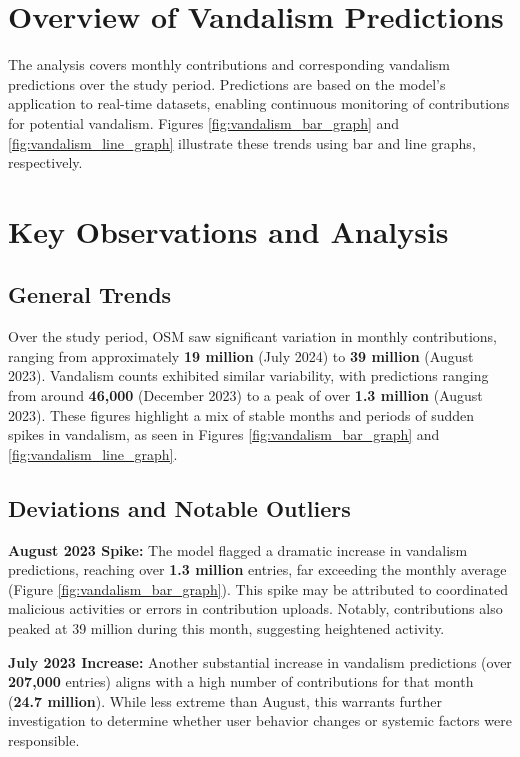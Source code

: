 \documentclass[
    13pt, %
    a4paper, %
    DIV14, %
    listof=totoc, %
    bibliography=totoc, %
    index=totoc, %
    headsepline
]{scrreprt}
\begin{document}
\section{Overview of Vandalism Predictions}
The analysis covers monthly contributions and corresponding vandalism predictions over the study period. Predictions are based on the model's application to real-time datasets, enabling continuous monitoring of contributions for potential vandalism. Figures \ref{fig:vandalism_bar_graph} and \ref{fig:vandalism_line_graph} illustrate these trends using bar and line graphs, respectively.

\section{Key Observations and Analysis}

\subsection{General Trends}
Over the study period, OSM saw significant variation in monthly contributions, ranging from approximately \textbf{19 million} (July 2024) to \textbf{39 million} (August 2023). Vandalism counts exhibited similar variability, with predictions ranging from around \textbf{46,000} (December 2023) to a peak of over \textbf{1.3 million} (August 2023). These figures highlight a mix of stable months and periods of sudden spikes in vandalism, as seen in Figures \ref{fig:vandalism_bar_graph} and \ref{fig:vandalism_line_graph}.

\subsection{Deviations and Notable Outliers}
\textbf{August 2023 Spike:} The model flagged a dramatic increase in vandalism predictions, reaching over \textbf{1.3 million} entries, far exceeding the monthly average (Figure \ref{fig:vandalism_bar_graph}). This spike may be attributed to coordinated malicious activities or errors in contribution uploads. Notably, contributions also peaked at 39 million during this month, suggesting heightened activity.

\textbf{July 2023 Increase:} Another substantial increase in vandalism predictions (over \textbf{207,000} entries) aligns with a high number of contributions for that month (\textbf{24.7 million}). While less extreme than August, this warrants further investigation to determine whether user behavior changes or systemic factors were responsible.
\end{document}
